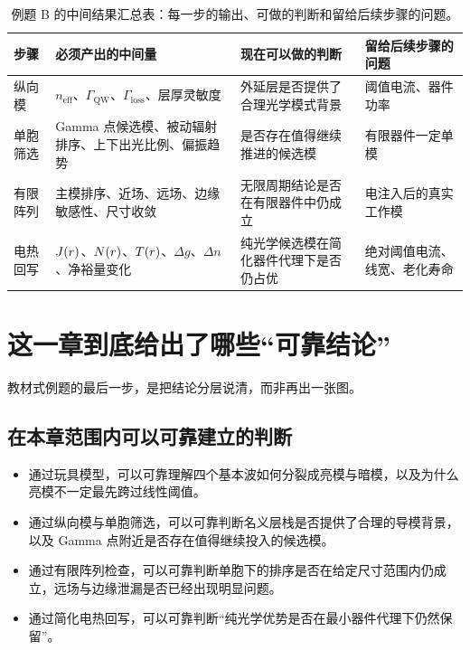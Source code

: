 \begin{table}[htbp]
  \centering
  \footnotesize
  \caption{例题 B 的中间结果汇总表：每一步的输出、可做的判断和留给后续步骤的问题。}
  \label{tab:worked-summary}
  \setlength{\tabcolsep}{4pt}
  \begin{tabularx}{\textwidth}{@{}p{1.5cm}p{3.1cm}Y Y@{}}
    \toprule
    步骤 & 必须产出的中间量 & 现在可以做的判断 & 留给后续步骤的问题 \\
    \midrule
    纵向模 & $n_{\mathrm{eff}}$、$\Gamma_{\mathrm{QW}}$、$\Gamma_{\mathrm{loss}}$、层厚灵敏度 & 外延层是否提供了合理光学模式背景 & 阈值电流、器件功率 \\
    单胞筛选 & Gamma 点候选模、被动辐射排序、上下出光比例、偏振趋势 & 是否存在值得继续推进的候选模 & 有限器件一定单模 \\
    有限阵列 & 主模排序、近场、远场、边缘敏感性、尺寸收敛 & 无限周期结论是否在有限器件中仍成立 & 电注入后的真实工作模 \\
    电热回写 & $J(r)$、$N(r)$、$T(r)$、$\Delta g$、$\Delta n$、净裕量变化 & 纯光学候选模在简化器件代理下是否仍占优 & 绝对阈值电流、线宽、老化寿命 \\
    \bottomrule
  \end{tabularx}
\end{table}

\section{这一章到底给出了哪些“可靠结论”}
教材式例题的最后一步，是把结论分层说清，而非再出一张图。

\subsection*{在本章范围内可以可靠建立的判断}
\begin{itemize}
  \item 通过玩具模型，可以可靠理解四个基本波如何分裂成亮模与暗模，以及为什么亮模不一定最先跨过线性阈值。
  \item 通过纵向模与单胞筛选，可以可靠判断名义层栈是否提供了合理的导模背景，以及 Gamma 点附近是否存在值得继续投入的候选模。
  \item 通过有限阵列检查，可以可靠判断单胞下的排序是否在给定尺寸范围内仍成立，远场与边缘泄漏是否已经出现明显问题。
  \item 通过简化电热回写，可以可靠判断“纯光学优势是否在最小器件代理下仍然保留”。
\end{itemize}

